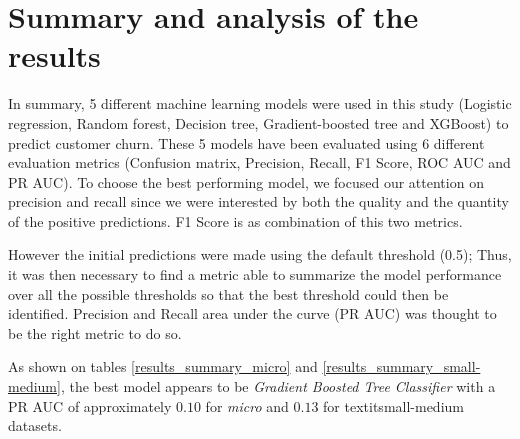 \documentclass[LaM,binding=0.6cm, english]{sapthesis}
\begin{document}
\section{Summary and analysis of the results}

In summary, 5 different machine learning models were used in this study (Logistic regression, Random forest, Decision tree, Gradient-boosted tree and XGBoost) to predict customer churn. These 5 models have been evaluated using 6 different evaluation metrics (Confusion matrix, Precision, Recall, F1 Score, ROC AUC and PR AUC). To choose the best performing model, we focused our attention on precision and recall since we were interested by both the quality and the quantity of the positive predictions. F1 Score is as combination of this two metrics. 

However the initial predictions were made using the default threshold (0.5); Thus, it was then necessary to find a metric able to summarize the model performance over all the possible thresholds so that the best threshold could then be identified. Precision and Recall area under the curve (PR AUC) was thought to be the right metric to do so.

As shown on tables \ref{results_summary_micro} and \ref{results_summary_small-medium}, the best model appears to be \textit{Gradient Boosted Tree Classifier} with a PR AUC of approximately $0.10$ for \textit{micro} and $0.13$ for textit{small-medium} datasets. 


\begin{table}[!ht]
\centering
{}
\vspace{2mm}
\caption{Results summary (Micro)}
\label{results_summary_micro}
\end{table}
\end{document}
